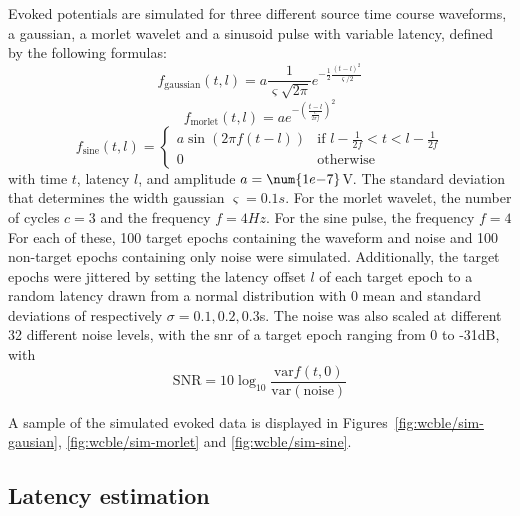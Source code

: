 Evoked potentials are simulated for three different source time course waveforms,
a gaussian, a morlet wavelet and a sinusoid pulse with variable latency,
defined by the following formulas:
\begin{equation}
  f_\text{gaussian}(t,l) = a
  \frac{1}{\varsigma\sqrt{2\pi}}e^{-\frac{1}{2}\frac{\left(t-l\right)^2}{\varsigma/2}}
\end{equation}
\begin{equation}
  f_\text{morlet}(t,l) = ae^{-\left(\frac{t-l}{\frac{c}{2\pi f}}\right)^2}
\end{equation}
\begin{equation}
  f_\text{sine}(t,l) =
  \begin{cases}
    a\sin\left(2\pi f\left(t-l\right)\right) & \text{if  $l-\frac{1}{2f} < t < l-\frac{1}{2f}$} \\
    0 & \text{otherwise}
  \end{cases}
\end{equation}
with time $t$, latency $l$, and amplitude $a=\num{1e{-7}}$V.
The standard deviation that determines the width gaussian $\varsigma=0.1s$.
For the morlet wavelet, the number of cycles $c=3$ and the frequency $f=4Hz$.
For the sine pulse, the frequency $f=4$
For each of these, 100 target epochs containing the waveform and noise and 100
non-target epochs containing only noise were simulated.
Additionally, the target epochs were jittered by setting the latency offset $l$
of each target epoch to a random latency drawn from a normal distribution with 0 mean and standard
deviations of respectively $\sigma=0.1,0.2,0.3$s.
The noise was also scaled at different 32  different noise levels, with the \ac{snr} of a
target epoch ranging from 0 to -31dB, with
\begin{equation}
  \text{SNR} = 10\log_{10}\frac{\text{var}f(t,0)}{\text{var}\left(\text{noise}\right)}
\end{equation}

A sample of the simulated evoked data is displayed in
Figures~\ref{fig:wcble/sim-gausian}, \ref{fig:wcble/sim-morlet} and
\ref{fig:wcble/sim-sine}.


\subsection{Latency estimation}


